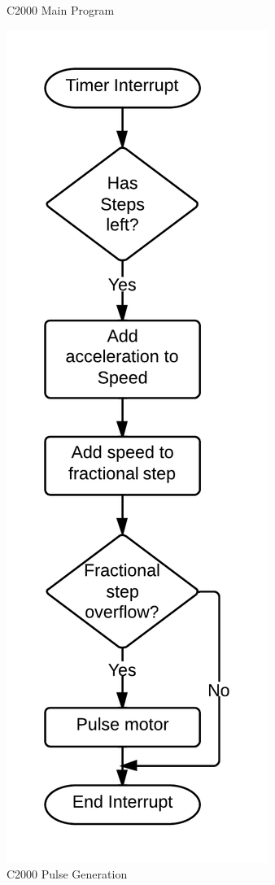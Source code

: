 \begin{figure}[!ht]
\begin{minipage}{.45\textwidth}
		\caption{C2000 Main Program}
		\label{fig:c2000-main}
	\end{minipage}
	\begin{minipage}{.45\textwidth}
		\centering
		\includegraphics[width=.75\textwidth]{c2000-pulse.png}
		\caption{C2000 Pulse Generation}
		\label{fig:c2000-pulse}
	\end{minipage}
\end{figure}